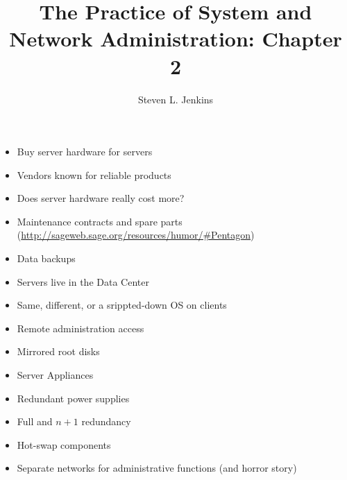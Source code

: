 \documentclass{slides}
\title{The Practice of System and Network Administration: Chapter 2}
\author{Steven L. Jenkins}
\newcommand{\bi}{\begin{itemize}}
\newcommand{\ei}{\end{itemize}}
\begin{document}
\maketitle


\bi
\item Buy server hardware for servers
\item Vendors known for reliable products
\item Does server hardware really cost more?
\item Maintenance contracts and spare parts (\url{http://sageweb.sage.org/resources/humor/#Pentagon})
\ei


\bi
\item Data backups
\item Servers live in the Data Center
\item Same, different, or a srippted-down OS on clients
\item Remote administration access
\item Mirrored root disks
\ei


\bi
\item Server Appliances
\item Redundant power supplies
\item Full and $n+1$ redundancy
\item Hot-swap components
\item Separate networks for administrative functions (and horror story)
\ei
\end{document}
